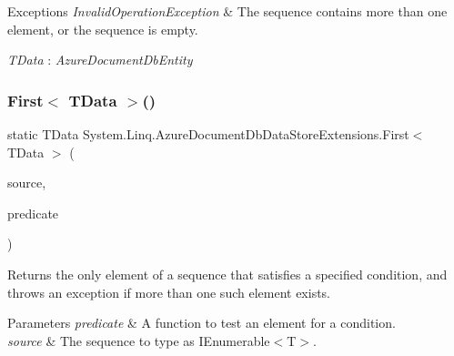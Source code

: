 \begin{DoxyExceptions}{Exceptions}
{\em Invalid\+Operation\+Exception} & The sequence contains more than one element, or the sequence is empty.\\
\hline
\end{DoxyExceptions}
\begin{Desc}
\item[Type Constraints]\begin{description}
\item[{\em T\+Data} : {\em Azure\+Document\+Db\+Entity}]\end{description}
\end{Desc}
\mbox{\label{classSystem_1_1Linq_1_1AzureDocumentDbDataStoreExtensions_aa9bf7da64ecd097ff4270abc3592b56e}} 
\subsubsection{\texorpdfstring{First$<$ T\+Data $>$()}{First< TData >()}\hspace{0.1cm}{\footnotesize\ttfamily [2/2]}}
{\footnotesize\ttfamily static T\+Data System.\+Linq.\+Azure\+Document\+Db\+Data\+Store\+Extensions.\+First$<$ T\+Data $>$ (\begin{DoxyParamCaption}\item[{this \hyperlink{classCqrs_1_1Azure_1_1DocumentDb_1_1DataStores_1_1AzureDocumentDbDataStore}{Azure\+Document\+Db\+Data\+Store}$<$ T\+Data $>$}]{source,  }\item[{Func$<$ T\+Data, bool $>$}]{predicate }\end{DoxyParamCaption})\hspace{0.3cm}{\ttfamily [static]}}



Returns the only element of a sequence that satisfies a specified condition, and throws an exception if more than one such element exists. 


\begin{DoxyParams}{Parameters}
{\em predicate} & A function to test an element for a condition.\\
\hline
{\em source} & The sequence to type as I\+Enumerable$<$\+T$>$.\\
\hline
\end{DoxyParams}

